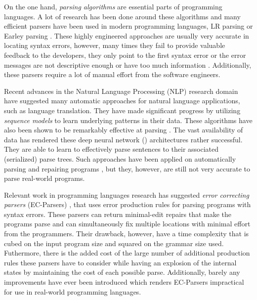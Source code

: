 On the one hand, \emph{parsing algorithms} are essential parts of programming
languages. A lot of research has been done around these algorithms and many
efficient parsers have been used in modern programming languages, \eg LR parsing
\citep{Aho1974} or Earley parsing \citep{Earley_1970}. These highly engineered
approaches are usually very accurate in locating syntax errors, however, many
times they fail to provide valuable feedback to the developers, \eg they only
point to the first syntax error or the error messages are not descriptive enough
or have too much information \citep{Kummerfeld2003, Ahadi_2018}. Additionally,
these parsers require a lot of manual effort from the software engineers.

Recent advances in the Natural Language Processing (NLP) research domain
\citep{Sutskever_2014, Hardalov_2018} have suggested many automatic approaches
for natural language applications, such as language translation. They have made
significant progress by utilizing \emph{sequence models} to learn underlying
patterns in their data. These algorithms have also been shown to be remarkably
effective at parsing \citep{Vinyals2015}. The vast availability of data has
rendered these deep neural network (\dnn) architectures rather successful. They
are able to learn to effectively parse sentences to their associated
(serialized) parse trees. Such approaches have been applied on automatically
parsing and repairing programs \citep{Ahmed_2021}, but they, however, are still
not very accurate to parse real-world programs.

Relevant work in programming languages research has suggested \emph{error
correcting parsers} (EC-Parsers) \citep{Aho_1972}, that uses error production
rules for parsing programs with syntax errors. These parsers can return
minimal-edit repairs that make the programs parse and can simultaneously fix
multiple locations with minimal effort from the programmers. Their drawback,
however, have a time complexity that is cubed on the input program size and
squared on the grammar size used. Futhermore, there is the added cost of the
large number of additional production rules these parsers have to consider while
having an explosion of the internal states by maintaining the cost of each
possible parse. Additionally, barely any improvements have ever been introduced
\citep{McLean1996, Rajasekaran2014} which renders EC-Parsers impractical for use
in real-world programming languages.

